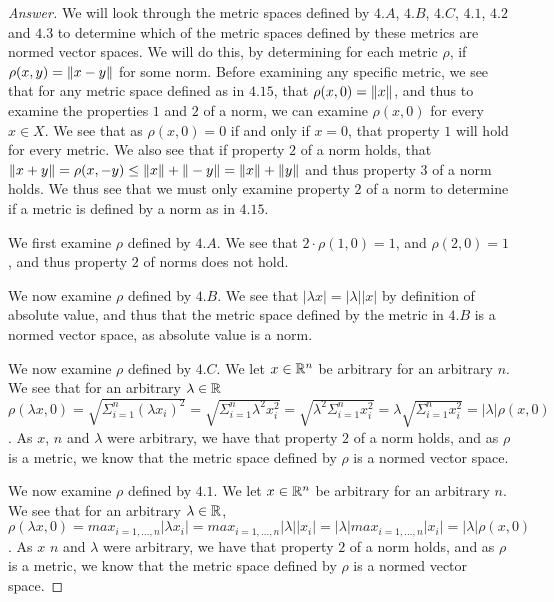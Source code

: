\begin{proof}[Answer]
  We will look through the metric spaces defined by $4.A$, $4.B$,
  $4.C$, $4.1$, $4.2$ and $4.3$ to determine which of the metric
  spaces defined by these 
  metrics are normed vector spaces. We will do this, by determining
  for each metric $\rho$, if $\rho(x,y)= \Vert x-y\Vert$ for some norm.
  Before examining any specific metric, we
  see that for any metric space defined as in $4.15$, that 
  $\rho(x,0)=\Vert x\Vert$, and thus to examine the
  properties $1$ and $2$ of a norm, we can examine $\rho(x,0)$ for
  every $x\in X$. We see that as $\rho(x,0)=0$ if and only if $x=0$,
  that property $1$ will hold for every metric. We also see that if
  property $2$ of a norm holds, that
  $\Vert x+y\Vert=\rho(x,-y) \leq \Vert x\Vert+\Vert-y\Vert=\Vert x\Vert + \Vert y\Vert$
  and thus property $3$ of a norm holds. We thus see that we must only
  examine property $2$ of a norm to determine if  a metric is defined
  by a norm as in $4.15$.

  We first examine $\rho$ defined by  $4.A$. We see that $2\cdot\rho(1,0)=1$, and
  $\rho(2,0)=1$, and thus property $2$ of norms does not hold.

  We now examine  $\rho$ defined by  $4.B$. We see that $|\lambda x|= |\lambda||x|$ by
  definition of absolute value, and thus that the metric space defined
  by the metric in $4.B$ is a normed vector space, as absolute value
  is a norm. 

  We now examine $\rho$ defined by $4.C$. We let $x \in \mathbb{R}^n$ be arbitrary for an
  arbitrary $n$. We see that for an arbitrary $\lambda \in \mathbb{R}$
  $\rho(\lambda x,0) = \sqrt{\Sigma_{i=1}^n (\lambda x_i)^2 }=
  \sqrt{\Sigma_{i=1}^n \lambda^2 x_i^2 }=
  \sqrt{\lambda^2 \Sigma_{i=1}^n x_i^2 } =
  \lambda \sqrt{\Sigma_{i=1}^n x_i^2 }= |\lambda|\rho(x,0)$. As $x$,
  $n$ and $\lambda$ were arbitrary, we have that 
  property $2$ of a norm holds, and as $\rho$ is a metric, we know that
  the metric space defined by $\rho$ is a normed vector space.

  We now examine $\rho$ defined by $4.1$. 
  We let $x\in \mathbb{R}^n$ be arbitrary for an arbitrary $n$. We see that 
  for an arbitrary $\lambda \in \mathbb{R}$, $\rho(\lambda x,0)=
  max_{i=1,...,n} |\lambda x_i| =
  max_{i=1,...,n} |\lambda| | x_i|=
  |\lambda| max_{i=1,...,n} | x_i|=
  |\lambda| \rho(x,0)$. As $x$  $n$ and $\lambda$ were arbitrary,
  we have that property $2$ of a norm holds, and as $\rho$ is a
  metric, we know that the metric space defined by $\rho$ is a normed
  vector space. 


\end{proof}
